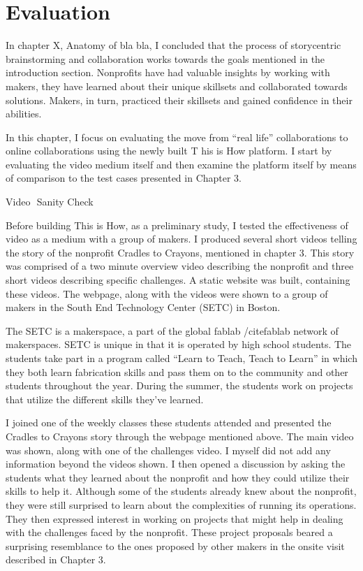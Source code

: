 \chapter{Evaluation}
\label{chap_eval}

In chapter X, Anatomy of bla bla, I concluded that the process of story­centric brainstorming and collaboration works towards the goals mentioned in the introduction section. Nonprofits have had valuable insights by working with makers, they have learned about their unique skillsets and collaborated towards solutions. Makers, in turn, practiced their skillsets and gained confidence in their abilities.

In this chapter, I focus on evaluating the move from ``real life'' collaborations to online collaborations using the newly built T  his is How platform. I start by evaluating the video medium itself and then examine the platform itself by means of comparison to the test cases presented in Chapter 3.

Video ­ Sanity Check

Before building  This is How, as a preliminary study, I tested the effectiveness of video as a medium with a group of makers. I produced several short videos telling the story of the nonprofit Cradles to Crayons, mentioned in chapter 3. This story was comprised of a two minute overview video describing the nonprofit and three short videos describing specific challenges. A static website was built, containing these videos. The webpage, along with the videos were shown to a group of makers in the South End Technology Center (SETC) in Boston.


The SETC is a makerspace, a part of the global fablab /cite{fablab} network of maker­spaces. SETC is unique in that it is operated by high school students. The students take part in a program called ``Learn to Teach, Teach to Learn'' in which they both learn fabrication skills and pass them on to the community and other students throughout the year. During the summer, the students work on projects that utilize the different skills they've learned.

I joined one of the weekly classes these students attended and presented the Cradles to Crayons story through the webpage mentioned above. The main video was shown, along with one of the challenges video. I myself did not add any information beyond the videos shown. I then opened a discussion by asking the students what they learned about the nonprofit and how they could utilize their skills to help it. Although some of the students already knew about the nonprofit, they were still surprised to learn about the complexities of running its operations. They then expressed interest in working on projects that might help in dealing with the challenges faced by the nonprofit. These project proposals beared a surprising resemblance to the ones proposed by other makers in the onsite visit described in Chapter 3.

